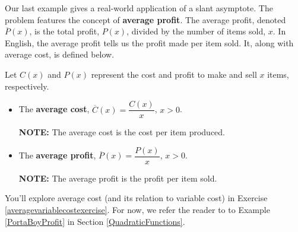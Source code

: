 Our last example gives a real-world application of a slant asymptote. The problem features the concept of \textbf{average profit}. The average profit, denoted $\overline{P}(x)$,  is the total profit, $P(x)$,  divided by the number of items sold, $x$. In English, the average profit tells us the profit made per item sold. It, along with average cost, is defined below.

\colorbox{ResultColor}{\bbm

\begin{defn} \label{averagecostprofit} Let $C(x)$ and $P(x)$ represent the cost and profit to make and sell $x$ items, respectively.

\begin{itemize}

\item    The  \textbf{average cost}, $\overline{C}(x) = \dfrac{C(x)}{x}$, $x > 0$.  

\textbf{NOTE:}  The average cost is the cost per item produced.

\item   The  \textbf{average profit}, $\overline{P}(x) = \dfrac{P(x)}{x}$, $x > 0$.  

\textbf{NOTE:}  The average profit is the profit  per item sold.

\end{itemize}

\end{defn}

\ebm}

You'll explore average cost (and its relation to variable cost) in Exercise \ref{averagevariablecostexercise}.  For now, we refer the reader to to Example \ref{PortaBoyProfit}  in Section \ref{QuadraticFunctions}.

